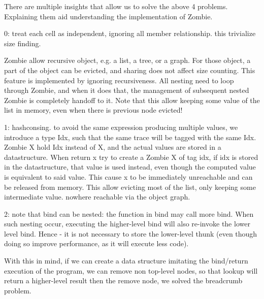 
There are multiple insights that allow us to solve the above 4 problems. Explaining them aid understanding the implementation of Zombie.

0: treat each cell as independent, ignoring all member relationship.
this trivialize size finding.

Zombie allow recursive object, e.g. a list, a tree, or a graph.
For those object, a part of the object can be evicted, and sharing does not affect size counting.
This feature is implemented by ignoring recursiveness. All nesting need to loop through Zombie, and when it does that, the management of subsequent nested Zombie is completely handoff to it.
Note that this allow keeping some value of the list in memory, even when there is previous node evicted!

1: hashconsing. to avoid the same expression producing multiple values, we introduce a type Idx, such that the same trace will be tagged with the same Idx.
Zombie X hold Idx instead of X, and the actual values are stored in a datastructure.
When return x try to create a Zombie X of tag idx, if idx is stored in the datastructure, that value is used instead, even though the computed value is equivalent to said value. This cause x to be immediately unreachable and can be released from memory. This allow evicting most of the list, only keeping some intermediate value. nowhere reachable via the object graph.

2: note that bind can be nested: the function in bind may call more bind. When such nesting occur, executing the higher-level bind will also re-invoke the lower level bind. Hence - it is not necessary to store the lower-level thunk (even though doing so improve performance, as it will execute less code).

With this in mind, if we can create a data structure imitating the bind/return execution of the program, we can remove non top-level nodes, so that lookup will return a higher-level result then the remove node, we solved the breadcrumb problem.